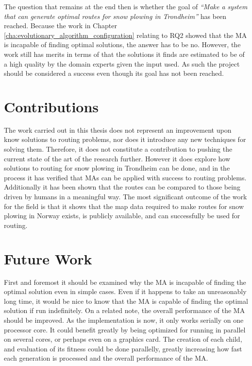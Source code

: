 The question that remains at the end then is whether the goal of \emph{\enquote{Make a system that can generate optimal routes for snow plowing in Trondheim}} has been reached. Because the work in Chapter \ref{cha:evolutionary_algorithm_configuration} relating to RQ2 showed that the MA is incapable of finding optimal solutions, the answer has to be no. However, the work still has merits in terms of that the solutions it finds are estimated to be of a high quality by the domain experts given the input used. As such the project should be considered a success even though its goal has not been reached.





\section{Contributions}

The work carried out in this thesis does not represent an improvement upon know solutions to routing problems, nor does it introduce any new techniques for solving them. Therefore, it does not constitute a contribution to pushing the current state of the art of the research further. However it does explore how solutions to routing for snow plowing in Trondheim can be done, and in the process it has verified that MAs can be applied with success to routing problems. Additionally it has been shown that the routes can be compared to those being driven by humans in a meaningful way. The most significant outcome of the work for the field is that it shows that the map data required to make routes for snow plowing in Norway exists, is publicly available, and can successfully be used for routing.

\section{Future Work}

First and foremost it should be examined why the MA is incapable of finding the optimal solution even in simple cases. Even if it happens to take an unreasonably long time, it would be nice to know that the MA is capable of finding the optimal solution if run indefinitely. On a related note, the overall performance of the MA should be improved. As the implementation is now, it only works serially on one processor core. It could benefit greatly by being optimized for running in parallel on several cores, or perhaps even on a graphics card. The creation of each child, and evaluation of its fitness could be done parallelly, greatly increasing how fast each generation is processed and the overall performance of the MA.

